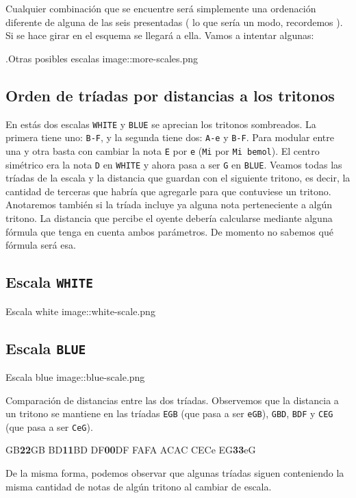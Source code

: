 \documentclass[]{article}
\begin{document}
Cualquier combinación que se encuentre será simplemente una ordenación diferente de alguna de las seis presentadas ( lo que sería un modo, recordemos ). Si se hace girar en el esquema se llegará a ella. Vamos a intentar algunas:

.Otras posibles escalas image::more-scales.png

\subsection{Orden de tríadas por distancias a los tritonos}

En estás dos escalas \texttt{WHITE} y \texttt{BLUE} se aprecian los tritonos sombreados. La primera tiene uno: \texttt{B-F}, y la segunda tiene dos: \texttt{A-e} y \texttt{B-F}. Para modular entre una y otra basta con cambiar la nota \texttt{E} por \texttt{e} (\texttt{Mi} por \texttt{Mi\ bemol}). El centro simétrico era la nota \texttt{D} en \texttt{WHITE} y ahora pasa a ser \texttt{G} en \texttt{BLUE}. Veamos todas las tríadas de la escala y la distancia que guardan con el siguiente tritono, es decir, la cantidad de terceras que habría que agregarle para que contuviese un tritono. Anotaremos también si la tríada incluye ya alguna nota perteneciente a algún tritono. La distancia que percibe el oyente debería calcularse mediante alguna fórmula que tenga en cuenta ambos parámetros. De momento no sabemos qué fórmula será esa.

\subsection{Escala \texttt{WHITE} }

Escala white image::white-scale.png

 \subsection{Escala \texttt{BLUE} }

Escala blue image::blue-scale.png

Comparación de distancias entre las dos tríadas. Observemos que la distancia a un tritono se mantiene en las tríadas \texttt{EGB} (que pasa a ser \texttt{eGB}), \texttt{GBD}, \texttt{BDF} y \texttt{CEG} (que pasa a ser \texttt{CeG}).

 GB\textbf{2}\textbf{2}GB BD\textbf{1}\textbf{1}BD DF\textbf{0}\textbf{0}DF FAFA ACAC CECe EG\textbf{3}\textbf{3}eG

 De la misma forma, podemos observar que algunas tríadas siguen conteniendo la misma cantidad de notas de algún tritono al cambiar de escala.
\end{document}
